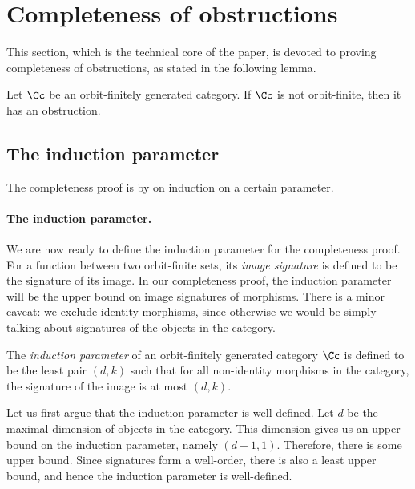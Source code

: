 
\section{Completeness of obstructions}
\label{sec:completeness-of-obstructions}


This section, which is the technical core of the paper, is devoted to proving  completeness of obstructions, as stated in the following lemma.
\begin{lemma}\label{lem:completeness-of-obstructions}
    Let $\Cc$ be an orbit-finitely generated category. If $\Cc$ is not orbit-finite, then it has an obstruction.
\end{lemma}



\subsection{The induction parameter}
\label{sec:induction-parameter}
The completeness proof is by on induction on a certain parameter. 

\paragraph*{The induction parameter.} We are now ready to define the induction parameter for the completeness proof.
For a function between two orbit-finite sets, its \emph{image signature} is defined to be the signature of its image. In our completeness proof, the induction parameter will be the upper bound on image signatures of morphisms. There is a minor caveat: we exclude identity morphisms, since otherwise we would be simply talking about signatures of the objects in the category.

\begin{definition}
    The \emph{induction parameter} of an orbit-finitely generated category $\Cc$ is defined to be the least pair $(d,k)$ such that for all non-identity morphisms in the category, the signature of the image is at most $(d,k)$.
\end{definition}

Let us first argue that the induction parameter is well-defined. Let $d$ be the maximal dimension of objects in the category. This dimension gives us an upper bound on the induction parameter, namely $(d+1,1)$. Therefore, there is some upper bound. 
Since signatures form a well-order, there is also a  least upper bound, and hence the induction parameter is well-defined.  

